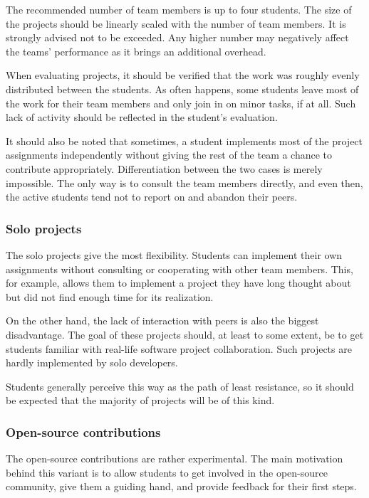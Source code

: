 \documentclass[
  digital,
  color,
  oneside,
  nosansbold,
  nocolorbold,
  lof,
  lot,
]{fithesis4}
\begin{document}
The recommended number of team members is up to four students. The size of the projects should be linearly scaled with the number of team members. It is strongly advised not to be exceeded. Any higher number may negatively affect the teams' performance as it brings an additional overhead.

When evaluating projects, it should be verified that the work was roughly evenly distributed between the students. As often happens, some students leave most of the work for their team members and only join in on minor tasks, if at all. Such lack of activity should be reflected in the student's evaluation.

It should also be noted that sometimes, a student implements most of the project assignments independently without giving the rest of the team a chance to contribute appropriately. Differentiation between the two cases is merely impossible. The only way is to consult the team members directly, and even then, the active students tend not to report on and abandon their peers.

\subsubsection{Solo projects}

The solo projects give the most flexibility. Students can implement their own assignments without consulting or cooperating with other team members. This, for example, allows them to implement a project they have long thought about but did not find enough time for its realization.

On the other hand, the lack of interaction with peers is also the biggest disadvantage. The goal of these projects should, at least to some extent, be to get students familiar with real-life software project collaboration. Such projects are hardly implemented by solo developers.

Students generally perceive this way as the path of least resistance, so it should be expected that the majority of projects will be of this kind.

\subsubsection{Open-source contributions}

The open-source contributions are rather experimental. The main motivation behind this variant is to allow students to get involved in the open-source community, give them a guiding hand, and provide feedback for their first steps. 
\end{document}
